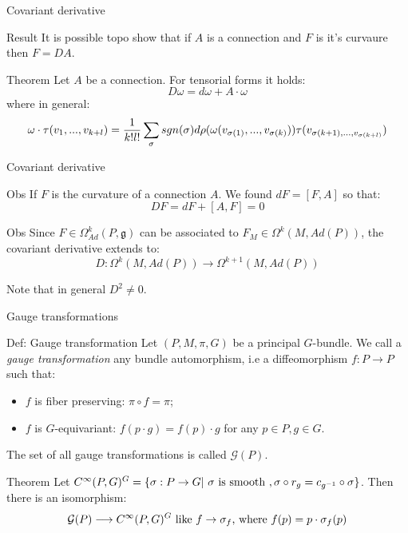 \documentclass{beamer}
\begin{document}
\begin{frame}{Covariant derivative}
	\begin{block}{Result}
		It is possible topo show that if $A$ is a connection and $F$ is it's curvaure then $F=DA$.
	\end{block}
	\begin{alertblock}{Theorem}
		Let $A$ be a connection. For tensorial forms it holds:
		$$D\omega=d\omega+A\cdot\omega $$
		where in general:
		$$\omega\cdot \tau(v_1,...,v_{k+l})={1\over k!l!}\sum_\sigma sgn(\sigma)d\rho(\omega(v_{\sigma(1)},...,v_{\sigma(k)}))\tau(v_{\sigma(k+1),...,v_{\sigma(k+l)}})$$
	\end{alertblock}
\end{frame}
\begin{frame}{Covariant derivative}
	\begin{exampleblock}{Obs}
		If $F$ is the curvature of a connection $A$. We found $dF=[F,A]$ so that:
		$$DF=dF+[A,F]=0$$
	\end{exampleblock}
	\begin{exampleblock}{Obs}
		Since $F\in\Omega^k_{Ad}(P,\mathfrak{g})$ can be associated to $F_M\in\Omega^k(M,Ad(P))$, the covariant derivative extends to:
		$$D:\Omega^k(M,Ad(P))\rightarrow \Omega^{k+1}(M,Ad(P))$$
	\end{exampleblock}
	Note that in general $D^2\neq 0$.
\end{frame}
\begin{frame}{Gauge transformations}
	\begin{exampleblock}{Def: Gauge transformation}
		Let $(P,M,\pi,G)$ be a principal $G$-bundle. We call a \textit{gauge transformation} any bundle automorphism, i.e a diffeomorphism $f:P\rightarrow P$ such that:
		\begin{itemize}
			\item $f$ is fiber preserving: $\pi\circ f=\pi$;
			\item $f$ is $G$-equivariant: $f(p\cdot g)=f(p)\cdot g$ for any $p\in P, g\in G$.
		\end{itemize}
		The set of all gauge transformations is called $\mathcal{G}(P)$.
	\end{exampleblock}
	\begin{alertblock}{Theorem}
		Let $C^\infty(P,G)^G=\{\sigma:P\rightarrow G|\hbox{ }\sigma\hbox{ is smooth },\sigma\circ r_g=c_{g^{-1}}\circ \sigma\}$.
		Then there is an isomorphism:
		$$\mathcal{G}(P)\longrightarrow C^\infty(P,G)^G\hbox{ like }f\rightarrow \sigma_f\hbox{, where } f(p)=p\cdot \sigma_f(p)$$
	\end{alertblock}
\end{frame}
\end{document}
